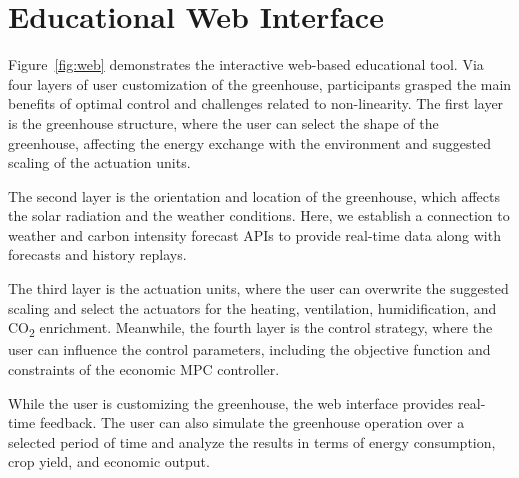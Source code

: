 \documentclass[conference]{IEEEtran}
\begin{document}
\section{Educational Web Interface}
Figure~\ref{fig:web} demonstrates the interactive web-based educational tool. Via four layers of user customization of the greenhouse,
participants grasped the main benefits of optimal control and challenges related to non-linearity. The first layer is the greenhouse structure, where the user can select the shape of the greenhouse, affecting the energy exchange with the environment and suggested scaling of the actuation units.

The second layer is the orientation and location of the greenhouse, which affects the solar radiation and the weather conditions. Here, we establish a connection to weather and carbon intensity forecast APIs to provide real-time data along with forecasts and history replays.

The third layer is the actuation units, where the user can overwrite the suggested scaling and select the actuators for the heating, ventilation, humidification, and CO\textsubscript{2} enrichment. Meanwhile, the fourth layer is the control strategy, where the user can influence the control parameters, including the objective function and constraints of the economic MPC controller.

While the user is customizing the greenhouse, the web interface provides real-time feedback. The user can also simulate the greenhouse operation over a selected period of time and analyze the results in terms of energy consumption, crop yield, and economic output.
\end{document}
